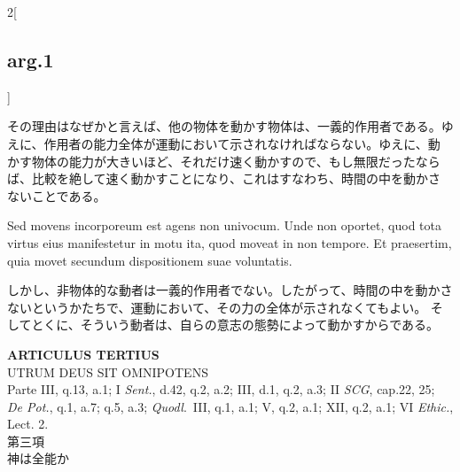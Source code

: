 \documentclass[paper=a4paper,fontsize=10pt,jafontsize=9pt,titlepage]{jlreq}
\begin{document}
\begin{paracol}{2}[\subsection{arg.1}]
\switchcolumn

その理由はなぜかと言えば、他の物体を動かす物体は、一義的作用者である。ゆ
 えに、作用者の能力全体が運動において示されなければならない。ゆえに、動
 かす物体の能力が大きいほど、それだけ速く動かすので、もし無限だったなら
 ば、比較を絶して速く動かすことになり、これはすなわち、時間の中を動かさ
 ないことである。

\switchcolumn*

Sed movens incorporeum est agens non univocum. Unde non
 oportet, quod tota virtus eius manifestetur in motu ita, quod moveat in
 non tempore. Et praesertim, quia movet secundum dispositionem suae
 voluntatis.

\switchcolumn

しかし、非物体的な動者は一義的作用者でない。したがって、時間の中を動かさ
 ないというかたちで、運動において、その力の全体が示されなくてもよい。
そしてとくに、そういう動者は、自らの意志の態勢によって動かすからである。

\end{paracol}
\newpage
{}
{}
\setcounter{section}{3}
\setcounter{subsection}{0}




\begin{center}
 {\Large {\bfseries ARTICULUS TERTIUS}}\\
 {\large UTRUM DEUS SIT OMNIPOTENS}\\
 {\footnotesize Parte III, q.13, a.1; I {\itshape Sent.}, d.42, q.2,
 a.2; III, d.1, q.2, a.3; II {\itshape SCG}, cap.22, 25; {\itshape De
 Pot.}, q.1, a.7; q.5, a.3; {\itshape Quodl}.~III, q.1, a.1; V, q.2,
 a.1; XII, q.2, a.1; VI {\itshape Ethic.}, Lect. 2.}\\
 {\Large 第三項\\神は全能か}
\end{center}
\end{document}
